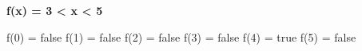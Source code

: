 \begin{frame}
	\vspace{3.0mm}
    \textbf{f(x) = 3 < x < 5}
    \begin{center}
        f(0) = false
        f(1) = false
        f(2) = false
        f(3) = false
        f(4) = true
        f(5) = false
    \end{center}
\end{frame}